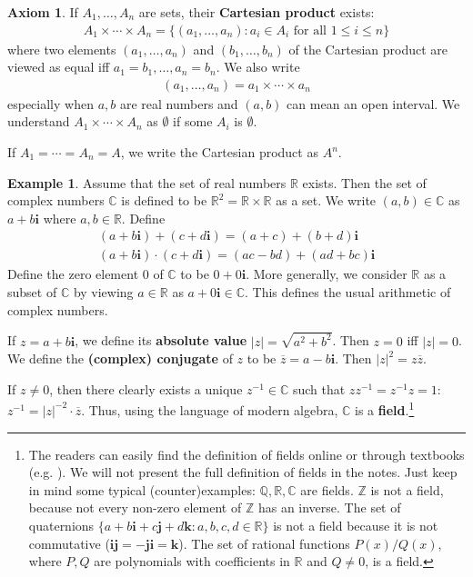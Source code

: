 \documentclass[12pt,b5paper,notitlepage]{article}
\theoremstyle{definition}
\newtheorem{eg}[df]{Example}
\newtheorem*{axiom}{Axiom}
\theoremstyle{plain}
\newcommand{\ovl}{\overline}
\newcommand{\im}{\mathbf{i}}
\newcommand{\Cbb}{\mathbb C}
\newcommand{\Zbb}{\mathbb Z}
\newcommand{\Qbb}{\mathbb Q}
\newcommand{\Rbb}{\mathbb R}
\numberwithin{equation}{section}
\begin{document}
\begin{axiom}
If $A_1,\dots,A_n$ are sets, their \textbf{Cartesian product} exists:
\begin{align*}
A_1\times\cdots\times A_n=\{(a_1,\dots,a_n): a_i\in A_i\text{ for all }1\leq i\leq n\}
\end{align*}
where two elements $(a_1,\dots,a_n)$ and $(b_1,\dots,b_n)$ of the Cartesian product are viewed as equal iff $a_1=b_1,\dots,a_n=b_n$. We also write
\begin{align*}
(a_1,\dots,a_n)=a_1\times\cdots\times a_n
\end{align*}
especially when $a,b$ are real numbers and $(a,b)$ can mean an open interval. We understand $A_1\times\cdots\times A_n$ as $\emptyset$ if some $A_i$ is $\emptyset$.

If $A_1=\cdots=A_n=A$, we write the Cartesian product as $A^n$. \hfill\qedsymbol
\end{axiom}

\begin{eg}
Assume that the set of real numbers $\Rbb$ exists. Then the set of complex numbers $\Cbb$ \index{C@$\Cbb$, the set of complex numbers} is defined to be $\Rbb^2=\Rbb\times\Rbb$ as a set. We write $(a,b)\in\Cbb$ as $a+b\im$ where $a,b\in\Rbb$. Define
\begin{gather*}
(a+b\im)+(c+d\im)=(a+c)+(b+d)\im\\
(a+b\im)\cdot (c+d\im)=(ac-bd)+(ad+bc)\im
\end{gather*}
Define the zero element $0$ of $\Cbb$ to be $0+0\im$. More generally, we consider $\Rbb$ as a subset of $\Cbb$ by viewing $a\in\Rbb$ as $a+0\im\in\Cbb$. This defines the usual arithmetic of complex numbers. 

If $z=a+b\im$, we define its \textbf{absolute value} $|z|=\sqrt{a^2+b^2}$. Then $z=0$ iff $|z|=0$. We define the \textbf{(complex) conjugate} of $z$ to be $\ovl z=a-b\im$. Then $|z|^2=z\ovl z$.

If $z\neq 0$, then there clearly exists a unique $z^{-1}\in\Cbb$ such that $zz^{-1}=z^{-1}z=1$:  $z^{-1}=|z|^{-2}\cdot \ovl z$. Thus, using the language of modern algebra, $\Cbb$ is a  \textbf{field}.\footnote{The readers can easily find the definition of fields online or through textbooks (e.g. \cite[Def. 1.12]{Rud-P}). We will not present the full definition of fields in the notes. Just keep in mind some typical (counter)examples: $\Qbb,\Rbb,\Cbb$ are fields. $\Zbb$ is not a field, because not every non-zero element of $\Zbb$ has an inverse. The set of quaternions $\{a+b\im+c\mathbf{j}+d\mathbf{k}: a,b,c,d\in\Rbb\}$ is not a field because it is not commutative ($\im\mathbf{j}=-\mathbf{j}\im=\mathbf{k}$). The set of rational functions $P(x)/Q(x)$, where $P,Q$ are polynomials with coefficients in $\Rbb$ and $Q\neq 0$, is a field.}  \hfill\qedsymbol
\end{eg}
\end{document}

